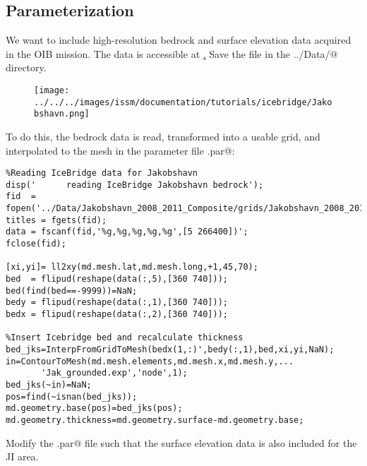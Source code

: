 \subsection{Parameterization} %
We want to include high-resolution bedrock and surface elevation data acquired in the OIB mission. The data is accessible at \href{http://data.cresis.ku.edu/data/grids/Jakobshavn_2008_2011_Composite_XYZGrid.txt}. Save the file in the \verb@../Data/@ directory.
\begin{figure}[H]
	\begin{center}
	\texttt{[image: ../../../images/issm/documentation/tutorials/icebridge/Jakobshavn.png]}
\end{center}
\end{figure}
To do this, the bedrock data is read, transformed into a usable grid, and interpolated to the mesh in the parameter file \verb@Greenland.par@:
\begin{verbatim}%Reading IceBridge data for Jakobshavn
disp('      reading IceBridge Jakobshavn bedrock');
fid  = fopen('../Data/Jakobshavn_2008_2011_Composite/grids/Jakobshavn_2008_2011_Composite_XYZGrid.txt');
titles = fgets(fid); 
data = fscanf(fid,'%g,%g,%g,%g,%g',[5 266400])';
fclose(fid);

[xi,yi]= ll2xy(md.mesh.lat,md.mesh.long,+1,45,70);
bed  = flipud(reshape(data(:,5),[360 740])); bed(find(bed==-9999))=NaN;
bedy = flipud(reshape(data(:,1),[360 740]));
bedx = flipud(reshape(data(:,2),[360 740]));

%Insert Icebridge bed and recalculate thickness
bed_jks=InterpFromGridToMesh(bedx(1,:)',bedy(:,1),bed,xi,yi,NaN);
in=ContourToMesh(md.mesh.elements,md.mesh.x,md.mesh.y,...
	   'Jak_grounded.exp','node',1);
bed_jks(~in)=NaN;
pos=find(~isnan(bed_jks));
md.geometry.base(pos)=bed_jks(pos);
md.geometry.thickness=md.geometry.surface-md.geometry.base;\end{verbatim}

Modify the \verb@Greenland.par@ file such that the surface elevation data is also included for the JI area.

\vspace{5cm}

